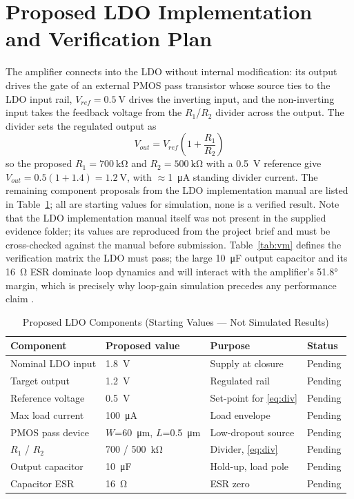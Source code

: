 \documentclass[conference]{IEEEtran}
\begin{document}
\section{Proposed LDO Implementation and Verification Plan}
The amplifier connects into the LDO without internal modification: its output
drives the gate of an external PMOS pass transistor whose source ties to the
LDO input rail, $V_{ref}=\SI{0.5}{\volt}$ drives the inverting input, and the
non-inverting input takes the feedback voltage from the $R_1$/$R_2$ divider
across the output. The divider sets the regulated output as
\begin{equation}
V_{out} = V_{ref}\left(1 + \frac{R_1}{R_2}\right)
\label{eq:div}
\end{equation}
so the proposed $R_1=\SI{700}{\kilo\ohm}$ and $R_2=\SI{500}{\kilo\ohm}$ with
a \SI{0.5}{\volt} reference give $V_{out}=0.5(1+1.4)=\SI{1.2}{\volt}$, with
$\approx$\SI{1}{\micro\ampere} standing divider current. The remaining
component proposals from the LDO implementation manual are listed in
Table~\ref{tab:ldo}; all are starting values for simulation, none is a
verified result. Note that the LDO implementation manual itself was not
present in the supplied evidence folder; its values are reproduced from the
project brief and must be cross-checked against the manual before submission.
Table~\ref{tab:vm} defines the verification matrix the LDO must pass; the
large \SI{10}{\micro\farad} output capacitor and its \SI{16}{\ohm} ESR
dominate loop dynamics and will interact with the amplifier's \ang{51.8}
margin, which is precisely why loop-gain simulation precedes any performance
claim \cite{rincon1998}.

\begin{table}[!t]
\caption{Proposed LDO Components (Starting Values --- Not Simulated Results)}
\label{tab:ldo}
\centering\footnotesize
\begin{tabular}{@{}llll@{}}
\toprule
Component & Proposed value & Purpose & Status \\
\midrule
Nominal LDO input & \SI{1.8}{\volt} & Supply at closure & Pending \\
Target output & \SI{1.2}{\volt} & Regulated rail & Pending \\
Reference voltage & \SI{0.5}{\volt} & Set-point for \eqref{eq:div} & Pending \\
Max load current & \SI{100}{\micro\ampere} & Load envelope & Pending \\
PMOS pass device & $W$=\SI{60}{\micro\metre}, $L$=\SI{0.5}{\micro\metre} & Low-dropout source & Pending \\
$R_1$ / $R_2$ & 700 / \SI{500}{\kilo\ohm} & Divider, \eqref{eq:div} & Pending \\
Output capacitor & \SI{10}{\micro\farad} & Hold-up, load pole & Pending \\
Capacitor ESR & \SI{16}{\ohm} & ESR zero & Pending \\
\bottomrule
\end{tabular}
\end{table}
\end{document}
